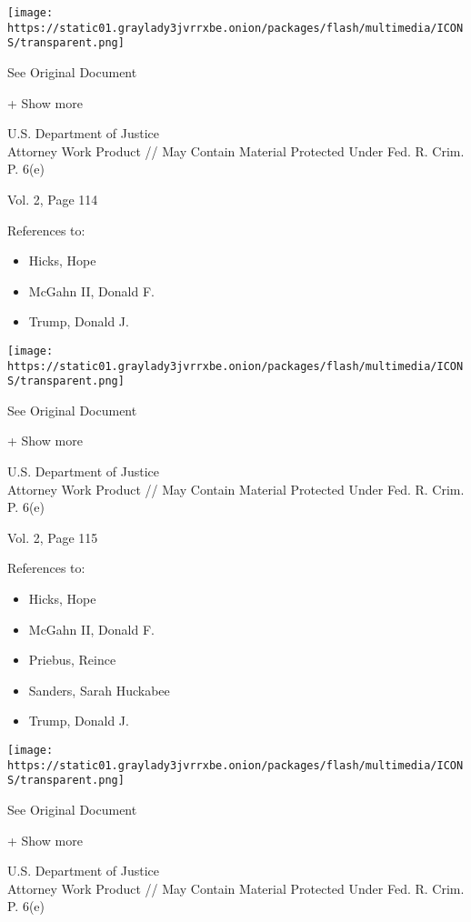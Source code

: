 \protect\hyperlink{}{}

\texttt{[image: https://static01.graylady3jvrrxbe.onion/packages/flash/multimedia/ICONS/transparent.png]}

See Original Document

+ Show more

U.S. Department of Justice\\
Attorney Work Product // May Contain Material Protected Under Fed. R.
Crim. P. 6(e)

Vol. 2, Page 114

References to:

\begin{itemize}
\tightlist
\item
  Hicks, Hope
\item
  McGahn II, Donald F.
\item
  Trump, Donald J.
\end{itemize}

\protect\hyperlink{}{}

\texttt{[image: https://static01.graylady3jvrrxbe.onion/packages/flash/multimedia/ICONS/transparent.png]}

See Original Document

+ Show more

U.S. Department of Justice\\
Attorney Work Product // May Contain Material Protected Under Fed. R.
Crim. P. 6(e)

Vol. 2, Page 115

References to:

\begin{itemize}
\tightlist
\item
  Hicks, Hope
\item
  McGahn II, Donald F.
\item
  Priebus, Reince
\item
  Sanders, Sarah Huckabee
\item
  Trump, Donald J.
\end{itemize}

\protect\hyperlink{}{}

\texttt{[image: https://static01.graylady3jvrrxbe.onion/packages/flash/multimedia/ICONS/transparent.png]}

See Original Document

+ Show more

U.S. Department of Justice\\
Attorney Work Product // May Contain Material Protected Under Fed. R.
Crim. P. 6(e)

